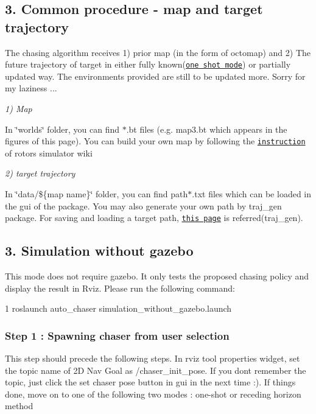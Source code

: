 \subsection*{3. Common procedure -\/ map and target trajectory}

The chasing algorithm receives 1) prior map (in the form of octomap) and 2) The future trajectory of target in either fully known(\href{#oneshot}{\tt one shot mode}) or partially updated way. The environments provided are still to be updated more. Sorry for my laziness ...

{\itshape 1) Map}

In \char`\"{}worlds\char`\"{} folder, you can find $\ast$.bt files (e.\+g. map3.\+bt which appears in the figures of this page). You can build your own map by following the \href{https://github.com/ethz-asl/rotors_simulator/wiki/Generate-an-octomap-from-your-world}{\tt instruction} of rotors simulator wiki

{\itshape 2) target trajectory}

In \char`\"{}data/\$\{map name\}\char`\"{} folder, you can find path$\ast$.txt files which can be loaded in the gui of the package. You may also generate your own path by traj\+\_\+gen package. For saving and loading a target path, \href{https://github.com/icsl-Jeon/traj_gen}{\tt this page} is referred(traj\+\_\+gen). \label{_without}%
 \subsection*{3. Simulation without gazebo}

This mode does not require gazebo. It only tests the proposed chasing policy and display the result in Rviz. Please run the following command\+:


\begin{DoxyCode}
1 roslaunch auto\_chaser simulation\_without\_gazebo.launch
\end{DoxyCode}


\subsubsection*{Step 1 \+: Spawning chaser from user selection}

This step should precede the following steps. In rviz tool properties widget, set the topic name of 2D Nav Goal as /chaser\+\_\+init\+\_\+pose. If you don\textquotesingle{}t remember the topic, just click the {\ttfamily set chaser pose button} in gui in the next time \+:). If things done, move on to one of the following two modes \+: one-\/shot or receding horizon method

